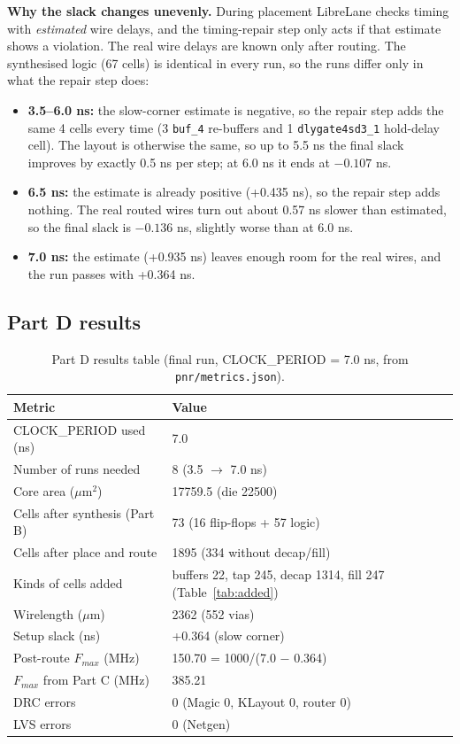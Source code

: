 \documentclass[10pt,a4paper,twocolumn]{article}
\newcommand{\um}{$\mu$m}
\newcommand{\umsq}{$\mu$m$^2$}
\newcommand{\cell}[1]{\texttt{#1}}
\begin{document}
\textbf{Why the slack changes unevenly.} During placement LibreLane checks timing with \emph{estimated} wire
delays, and the timing-repair step only acts if that estimate shows a violation. The real wire delays are known
only after routing. The synthesised logic (67 cells) is identical in every run, so the runs differ only in what
the repair step does:
\begin{itemize}[nosep]
  \item \textbf{3.5--6.0 ns:} the slow-corner estimate is negative, so the repair step adds the same 4 cells every
        time (3 \cell{buf\_4} re-buffers and 1 \cell{dlygate4sd3\_1} hold-delay cell). The layout is otherwise the
        same, so up to 5.5 ns the final slack improves by exactly 0.5 ns per step; at 6.0 ns it ends at $-0.107$ ns.
  \item \textbf{6.5 ns:} the estimate is already positive (+0.435 ns), so the repair step adds nothing. The real
        routed wires turn out about 0.57 ns slower than estimated, so the final slack is $-0.136$ ns, slightly worse
        than at 6.0 ns.
  \item \textbf{7.0 ns:} the estimate (+0.935 ns) leaves enough room for the real wires, and the run passes with
        +0.364 ns.
\end{itemize}

\subsection{Part D results}

\begin{table}[!htbp]
\centering
\begin{tabularx}{\columnwidth}{lY}
\toprule
\textbf{Metric} & \textbf{Value} \\
\midrule
CLOCK\_PERIOD used (ns) & 7.0 \\
Number of runs needed & 8 (3.5 $\rightarrow$ 7.0 ns) \\
Core area (\umsq) & 17759.5 (die 22500) \\
Cells after synthesis (Part B) & 73 (16 flip-flops + 57 logic) \\
Cells after place and route & 1895 (334 without decap/fill) \\
Kinds of cells added & buffers 22, tap 245, decap 1314, fill 247 (Table~\ref{tab:added}) \\
Wirelength (\um) & 2362 (552 vias) \\
Setup slack (ns) & +0.364 (slow corner) \\
Post-route $F_{max}$ (MHz) & 150.70 = 1000/(7.0 $-$ 0.364) \\
$F_{max}$ from Part C (MHz) & 385.21 \\
DRC errors & 0 (Magic 0, KLayout 0, router 0) \\
LVS errors & 0 (Netgen) \\
\bottomrule
\end{tabularx}
\caption{Part D results table (final run, CLOCK\_PERIOD = 7.0 ns, from \texttt{pnr/metrics.json}).}
\end{table}
\end{document}
